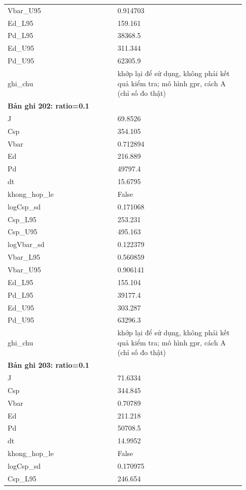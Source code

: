 \begin{longtable}{p{0.43\linewidth}p{0.50\linewidth}}
Vbar\_\allowbreak U95 & 0.914703 \\
Ed\_\allowbreak L95 & 159.161 \\
Pd\_\allowbreak L95 & 38368.5 \\
Ed\_\allowbreak U95 & 311.344 \\
Pd\_\allowbreak U95 & 62305.9 \\
ghi\_\allowbreak chu & khớp lại để sử dụng, không phải kết quả kiểm tra; mô hình gpr, cách A (chỉ số đo thật) \\
\midrule
\multicolumn{2}{p{0.95\linewidth}}{\textbf{Bản ghi 202: ratio=0.1}} \\
J & 69.8526 \\
Csp & 354.105 \\
Vbar & 0.712894 \\
Ed & 216.889 \\
Pd & 49797.4 \\
dt & 15.6795 \\
khong\_\allowbreak hop\_\allowbreak le & False \\
logCsp\_\allowbreak sd & 0.171068 \\
Csp\_\allowbreak L95 & 253.231 \\
Csp\_\allowbreak U95 & 495.163 \\
logVbar\_\allowbreak sd & 0.122379 \\
Vbar\_\allowbreak L95 & 0.560859 \\
Vbar\_\allowbreak U95 & 0.906141 \\
Ed\_\allowbreak L95 & 155.104 \\
Pd\_\allowbreak L95 & 39177.4 \\
Ed\_\allowbreak U95 & 303.287 \\
Pd\_\allowbreak U95 & 63296.3 \\
ghi\_\allowbreak chu & khớp lại để sử dụng, không phải kết quả kiểm tra; mô hình gpr, cách A (chỉ số đo thật) \\
\midrule
\multicolumn{2}{p{0.95\linewidth}}{\textbf{Bản ghi 203: ratio=0.1}} \\
J & 71.6334 \\
Csp & 344.845 \\
Vbar & 0.70789 \\
Ed & 211.218 \\
Pd & 50708.5 \\
dt & 14.9952 \\
khong\_\allowbreak hop\_\allowbreak le & False \\
logCsp\_\allowbreak sd & 0.170975 \\
Csp\_\allowbreak L95 & 246.654 \\

\end{longtable}
